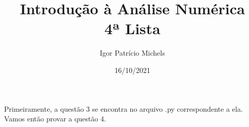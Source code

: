 \documentclass{article}
\title{Introdução à Análise Numérica \\ 4ª Lista}
\author{Igor Patrício Michels}
\date{16/10/2021}
\begin{document}
\maketitle

Primeiramente, a questão 3 se encontra no arquivo .py correspondente a ela. Vamos então provar a questão 4.

\begin{comment}
Note que, se temos um polinômio de grau máximo $n$ que passa pelos pontos $(i, -i), i\in \{1, 2, \dots, n\}$ e com termo independente igual a $(-1)^n$ deve ser o mesmo polinômio que o polinômio que passa pelos pontos $(i, -i), i\in \{1, 2, \dots, n\}$ e $(0, (-1)^n)$. Para $n$ ímpar, esse polinômio deve passar por $(0, -1)$, ou seja, ele deve ser da forma
\[P(x) = \sum_{i = 1}^{n}\left(\prod_{j\neq i} \dfrac{x - x_j}{x_i - x_j}\right)y_i.\]

Note que quando $x_i = 0$, temos $y_i = -1$, o que nos dá o termo
\[-\dfrac{x - 1}{-1}\cdot \dfrac{x - 2}{-2}\cdot \cdots \cdot \dfrac{x - n}{-n} = \dfrac{(x - 1)(x - 2)\cdots (x - n)}{n!} = \binom{x - 1}{n},\]

\noindent pois $n$ é ímpar.\footnote{Aqui temos um pequeno abuso de notação ao escrever $\binom{x - 1}{n}$, mas como o exercício fala explicitamente a respeito da imagem de naturais maiores que $n$, estou escrevendo dessa forma, onde deve se subentender que $x > n$ e $x$ natural.}

Já os demais termos $(x_i, y_i)$ resultam em
\[\dfrac{x - x_1}{x_i - x_1}\cdot \dfrac{x - x_2}{x_i - x_2}\cdot \cdots \cdot \dfrac{x - x_n}{x_i - x_n}\cdot \dfrac{x}{x_i}\cdot y_i = \dfrac{x - x_1}{x_i - x_1}\cdot \dfrac{x - x_2}{x_i - x_2}\cdot \cdots \cdot \dfrac{x - x_n}{x_i - x_n}\cdot \dfrac{x}{x_i}\cdot (-x_i) = -x\cdot \dfrac{x - x_1}{x_i - x_1}\cdot \dfrac{x - x_2}{x_i - x_2}\cdot \cdots \cdot \dfrac{x - x_n}{x_i - x_n}.\]

Dessa forma, nosso problema, quando $n$ é ímpar, se resume a provar que
\[\sum_{i = 1}^{n}\left(\prod_{j\neq i} \dfrac{x - j}{i - j}\right) = 1.\]

Mas note que, se $n = 1$, então a expressão acima não está bem definida. Entretanto, note que se $n = 1$, então o polinômio deve ter, no máximo, grau $1$ e passar pelos pontos $(0, -1)$ e $(1, -1)$, ou seja, ele deve ser a reta $y = -1$. Mas $-1 = k - 1 - k = \binom{k - 1}{1} - k$, o que prova a validade desse caso. Agora, vamos focar em $n$ ímpar maior que $1$. Para tanto, vamos definir
\[f_n(x) = \sum_{i = 1}^{n}\left(\prod_{j\neq i} \dfrac{x - j}{i - j}\right).\]


\end{comment}
\end{document}
